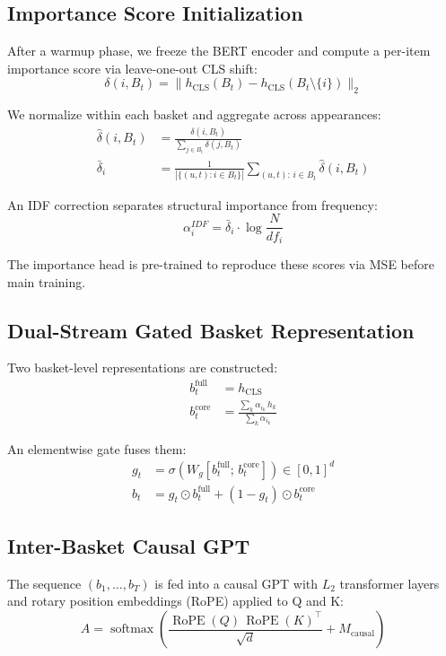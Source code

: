 \documentclass[conference]{IEEEtran}
\begin{document}
\subsection{Importance Score Initialization}
After a warmup phase, we freeze the BERT encoder and compute a per-item importance score via leave-one-out CLS shift:
\begin{equation}
\delta(i, B_t) = \|h_{\text{CLS}}(B_t) - h_{\text{CLS}}(B_t \setminus \{i\})\|_2
\end{equation}

We normalize within each basket and aggregate across appearances:
\begin{align}
\hat{\delta}(i, B_t) &= \frac{\delta(i, B_t)}{\sum_{j \in B_t} \delta(j, B_t)} \\
\bar{\delta}_i        &= \frac{1}{|\{(u,t):i \in B_t\}|} \sum_{(u,t):\,i \in B_t} \hat{\delta}(i, B_t)
\end{align}

An IDF correction separates structural importance from frequency:
\begin{equation}
\alpha_i^{IDF} = \bar{\delta}_i \cdot \log\frac{N}{df_i}
\end{equation}

The importance head is pre-trained to reproduce these scores via MSE before main training.

\subsection{Dual-Stream Gated Basket Representation}
Two basket-level representations are constructed:
\begin{align}
b_t^{\text{full}} &= h_{\text{CLS}} \\
b_t^{\text{core}} &= \frac{\sum_k \alpha_{i_k}\, h_k}{\sum_k \alpha_{i_k}}
\end{align}

An elementwise gate fuses them:
\begin{align}
g_t &= \sigma\!\left(W_g [b_t^{\text{full}};\, b_t^{\text{core}}]\right) \in [0,1]^d \\
b_t &= g_t \odot b_t^{\text{full}} + (1 - g_t) \odot b_t^{\text{core}}
\end{align}

\subsection{Inter-Basket Causal GPT}
The sequence $(b_1, \ldots, b_T)$ is fed into a causal GPT with $L_2$ transformer layers and rotary position embeddings (RoPE) applied to Q and K:
\begin{equation}
A = \operatorname{softmax}\!\left(\frac{\operatorname{RoPE}(Q)\,\operatorname{RoPE}(K)^\top}{\sqrt{d}} + M_{\text{causal}}\right)
\end{equation}
\end{document}
